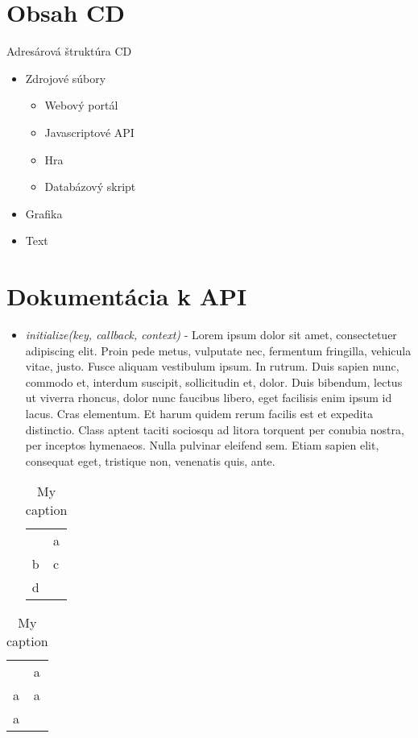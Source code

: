 \chapter{Obsah CD}
Adresárová štruktúra CD
\begin{itemize}
\item Zdrojové súbory
    \begin{itemize}
    \item Webový portál
    \item Javascriptové API
    \item Hra
    \item Databázový skript
    \end{itemize}
\item Grafika
\item Text
\end{itemize}
\chapter{Dokumentácia k API}
\begin{itemize}
\item \textit{initialize(key, callback, context)} - 
Lorem ipsum dolor sit amet, consectetuer adipiscing elit. Proin pede metus, vulputate nec, fermentum fringilla, vehicula vitae, justo. Fusce aliquam vestibulum ipsum. In rutrum. Duis sapien nunc, commodo et, interdum suscipit, sollicitudin et, dolor. Duis bibendum, lectus ut viverra rhoncus, dolor nunc faucibus libero, eget facilisis enim ipsum id lacus. Cras elementum. Et harum quidem rerum facilis est et expedita distinctio. Class aptent taciti sociosqu ad litora torquent per conubia nostra, per inceptos hymenaeos. Nulla pulvinar eleifend sem. Etiam sapien elit, consequat eget, tristique non, venenatis quis, ante.
\begin{table}[h]
\centering
\caption{My caption}
\label{my-label}
\begin{tabular}{ll}
 & a \\ b
 & c \\ d
 & 
\end{tabular}
\end{table}
\end{itemize}

\begin{table}[h]
\centering
\caption{My caption}
\label{my-label}
\begin{tabular}{ll}
 & a \\a
 &  a\\a
 & 
\end{tabular}
\end{table}

